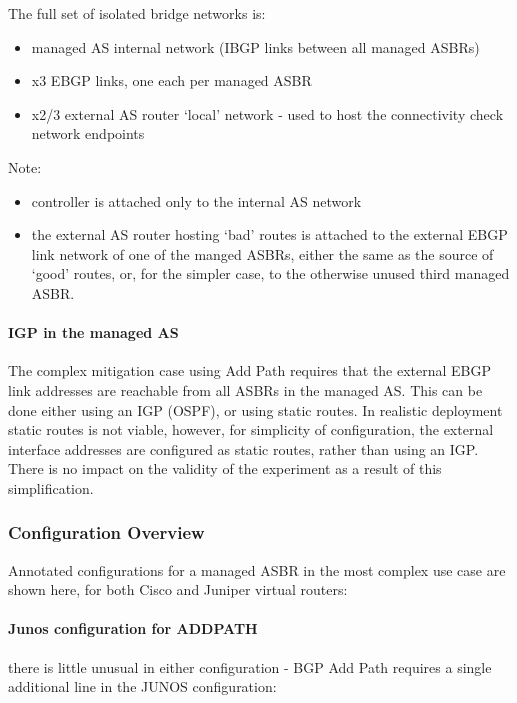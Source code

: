 The full set of isolated bridge networks is:
\begin{itemize}
    \item managed AS internal network (IBGP links between all managed ASBRs)
    \item x3 EBGP links, one each per managed ASBR
    \item x2/3 external AS router `local' network - used to host the connectivity check network endpoints
\end{itemize}

Note:
\begin{itemize}
    \item \hbgp controller is attached only to the internal AS network
    \item the external AS router hosting `bad' routes is attached to the external EBGP link network of one of the manged ASBRs, either the same as the source of `good' routes, or, for the simpler case, to the otherwise unused third managed ASBR.
\end{itemize}

\paragraph{IGP in the managed AS}
The complex mitigation case using Add Path requires that the external EBGP link addresses are reachable from all ASBRs in the managed AS.  This can be done either using an IGP (OSPF), or using static routes.  In realistic deployment static routes is not viable, however, for simplicity of configuration, the external interface addresses are configured as static routes, rather than using an IGP.  There is no impact on the validity of the experiment as a result of this simplification.

\subsubsection{Configuration Overview}


Annotated configurations for a managed ASBR in the most complex use case are shown here, for both Cisco and Juniper virtual routers:

\paragraph{Junos configuration for ADDPATH}
there is little unusual in either configuration - BGP Add Path requires a single additional line in the JUNOS configuration:


